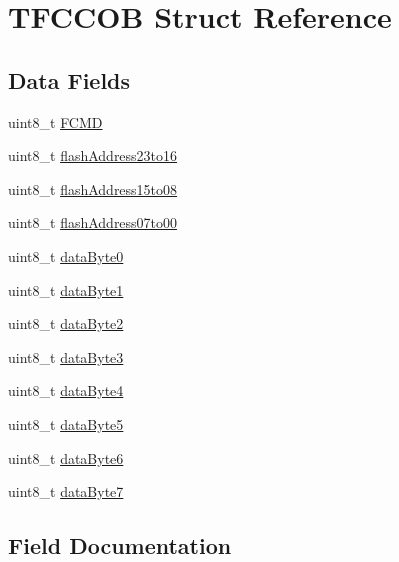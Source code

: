 \hypertarget{struct_t_f_c_c_o_b}{}\section{T\+F\+C\+C\+O\+B Struct Reference}
\label{struct_t_f_c_c_o_b}
\subsection*{Data Fields}
\begin{DoxyCompactItemize}
\item 
uint8\+\_\+t \hyperlink{struct_t_f_c_c_o_b_a6c5936523b8b63cbaaeed247f88f8e41}{F\+C\+M\+D}
\item 
uint8\+\_\+t \hyperlink{struct_t_f_c_c_o_b_a41e7ea5bf2b3dd4e0decbbbae999ca94}{flash\+Address23to16}
\item 
uint8\+\_\+t \hyperlink{struct_t_f_c_c_o_b_a96b625dc57b3ecdf9ceca8045404bc6b}{flash\+Address15to08}
\item 
uint8\+\_\+t \hyperlink{struct_t_f_c_c_o_b_afd754933fa5ff69f2c75d80a094c2f95}{flash\+Address07to00}
\item 
uint8\+\_\+t \hyperlink{struct_t_f_c_c_o_b_afe1ffc27722f769ccde0d10eca6d3c64}{data\+Byte0}
\item 
uint8\+\_\+t \hyperlink{struct_t_f_c_c_o_b_a0c700ddeb7af7a1fdf4613f23033e4d3}{data\+Byte1}
\item 
uint8\+\_\+t \hyperlink{struct_t_f_c_c_o_b_ab171d87e8477a175bc5fe774c17d1445}{data\+Byte2}
\item 
uint8\+\_\+t \hyperlink{struct_t_f_c_c_o_b_a8b09cfe8e42978d30fa6792fd59bda3b}{data\+Byte3}
\item 
uint8\+\_\+t \hyperlink{struct_t_f_c_c_o_b_a4bf5c1a84500abd0f4e78092b2ddb9a4}{data\+Byte4}
\item 
uint8\+\_\+t \hyperlink{struct_t_f_c_c_o_b_a8947206860f9581c055a4bddacac960f}{data\+Byte5}
\item 
uint8\+\_\+t \hyperlink{struct_t_f_c_c_o_b_aa0b944b3ea37a8c0f275cc333214cf3a}{data\+Byte6}
\item 
uint8\+\_\+t \hyperlink{struct_t_f_c_c_o_b_a237194280ea074bd46e909de1d977e07}{data\+Byte7}
\end{DoxyCompactItemize}


\subsection{Field Documentation}
\hypertarget{struct_t_f_c_c_o_b_afe1ffc27722f769ccde0d10eca6d3c64}{}
